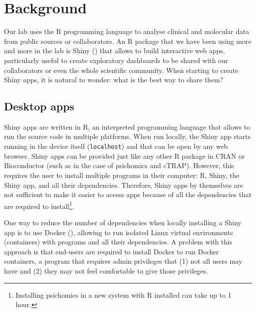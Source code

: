 
\section{Background}

Our lab uses the R programming language to analyse clinical and molecular data from public sources or collaborators. An R package that we have been using more and more in the lab is Shiny () that allows to build interactive web apps, particularly useful to create exploratory dashboards to be shared with our collaborators or even the whole scientific community. When starting to create Shiny apps, it is natural to wonder: what is the best way to share them?

\subsection{Desktop apps}

Shiny apps are written in R, an interpreted programming language that allows to run the source code in multiple platforms. When run locally, the Shiny app starts running in the device itself (\texttt{localhost}) and that can be open by any web browser. Shiny apps can be provided just like any other R package in CRAN or Bioconductor (such as in the case of psichomics and cTRAP). However, this requires the user to install multiple programs in their computer: R, Shiny, the Shiny app, and all their dependencies. Therefore, Shiny apps by themselves are not sufficient to make it easier to access apps because of all the dependencies that are required to install\footnote{Installing psichomics in a new system with R installed can take up to 1 hour.}.


One way to reduce the number of dependencies when locally installing a Shiny app is to use Docker (), allowing to run isolated Linux virtual environments (containers) with programs and all their dependencies. A problem with this approach is that end-users are required to install Docker to run Docker containers, a program that requires admin privileges that (1) not all users may have and (2) they may not feel comfortable to give those privileges.

